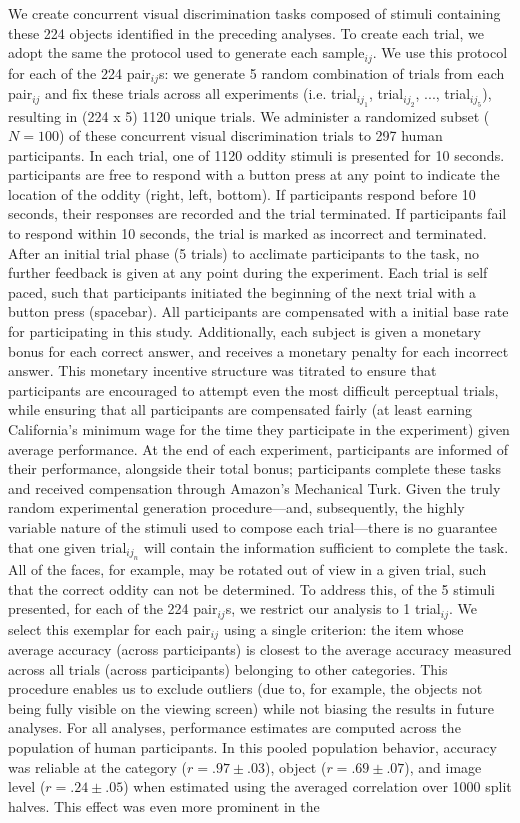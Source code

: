 \documentclass[11pt]{article}
\begin{document}
We create concurrent visual discrimination tasks composed of stimuli containing these 224 objects identified in the preceding analyses. To create each trial, we adopt the same the protocol used to generate each sample$_{ij}$. We use this protocol for each of the 224 pair$_{ij}$s: we generate 5 random combination of trials from each pair$_{ij}$ and fix these trials across all experiments (i.e. trial$_{ij_1}$, trial$_{ij_2}$, $...$, trial$_{ij_5}$), resulting in (224 x 5) 1120 unique trials. We administer a randomized subset ($N=100$) of these concurrent visual discrimination trials to 297 human participants. In each trial, one of 1120 oddity stimuli is presented for 10 seconds. participants are free to respond with a button press at any point to indicate the location of the oddity (right, left, bottom). If participants respond before 10 seconds, their responses are recorded and the trial terminated. If participants fail to respond within 10 seconds, the trial is marked as incorrect and terminated. After an initial trial phase (5 trials) to acclimate participants to the task, no further feedback is given at any point during the experiment. Each trial is self paced, such that participants initiated the beginning of the next trial with a button press (spacebar). All participants are compensated with a initial base rate for participating in this study. Additionally, each subject is given a monetary bonus for each correct answer, and receives a monetary penalty for each incorrect answer. This monetary incentive structure was titrated to ensure that participants are encouraged to attempt even the most difficult perceptual trials, while ensuring that all participants are compensated fairly (at least earning California’s minimum wage for the time they participate in the experiment) given average performance. At the end of each experiment, participants are informed of their performance, alongside their total bonus; participants complete these tasks and received compensation through Amazon’s Mechanical Turk. Given the truly random experimental generation procedure---and, subsequently, the highly variable nature of the stimuli used to compose each trial---there is no guarantee that one given trial$_{ij_n}$ will contain the information sufficient to complete the task. All of the faces, for example, may be rotated out of view in a given trial, such that the correct oddity can not be determined. To address this, of the 5 stimuli presented, for each of the 224 pair$_{ij}$s, we restrict our analysis to 1 trial$_{ij}$. We select this exemplar for each  pair$_{ij}$ using a single criterion: the item whose average accuracy (across participants) is closest to the average accuracy measured across all trials (across participants) belonging to other categories. This procedure enables us to exclude outliers (due to, for example, the objects not being fully visible on the viewing screen) while not biasing the results in future analyses. For all analyses, performance estimates are computed across the population of human participants. In this pooled population behavior, accuracy was reliable at the category ($r = .97 \pm .03$), object ($r = .69 \pm .07$), and image level  ($r = .24 \pm .05$) when estimated using the averaged correlation over 1000 split halves. This effect was even more prominent in the 
\end{document}
